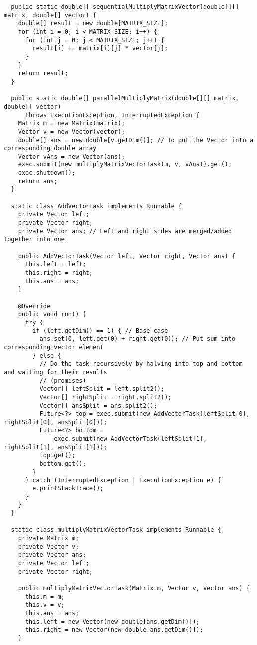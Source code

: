 \documentclass[11pt,letterpaper]{exam}
\begin{document}
\begin{lstlisting}
  public static double[] sequentialMultiplyMatrixVector(double[][] matrix, double[] vector) {
    double[] result = new double[MATRIX_SIZE];
    for (int i = 0; i < MATRIX_SIZE; i++) {
      for (int j = 0; j < MATRIX_SIZE; j++) {
        result[i] += matrix[i][j] * vector[j];
      }
    }
    return result;
  }

  public static double[] parallelMultiplyMatrix(double[][] matrix, double[] vector)
      throws ExecutionException, InterruptedException {
    Matrix m = new Matrix(matrix);
    Vector v = new Vector(vector);
    double[] ans = new double[v.getDim()]; // To put the Vector into a corresponding double array
    Vector vAns = new Vector(ans);
    exec.submit(new multiplyMatrixVectorTask(m, v, vAns)).get();
    exec.shutdown();
    return ans;
  }

  static class AddVectorTask implements Runnable {
    private Vector left;
    private Vector right;
    private Vector ans; // Left and right sides are merged/added together into one

    public AddVectorTask(Vector left, Vector right, Vector ans) {
      this.left = left;
      this.right = right;
      this.ans = ans;
    }

    @Override
    public void run() {
      try {
        if (left.getDim() == 1) { // Base case
          ans.set(0, left.get(0) + right.get(0)); // Put sum into corresponding vector element
        } else {
          // Do the task recursively by halving into top and bottom and waiting for their results
          // (promises)
          Vector[] leftSplit = left.split2();
          Vector[] rightSplit = right.split2();
          Vector[] ansSplit = ans.split2();
          Future<?> top = exec.submit(new AddVectorTask(leftSplit[0], rightSplit[0], ansSplit[0]));
          Future<?> bottom =
              exec.submit(new AddVectorTask(leftSplit[1], rightSplit[1], ansSplit[1]));
          top.get();
          bottom.get();
        }
      } catch (InterruptedException | ExecutionException e) {
        e.printStackTrace();
      }
    }
  }

  static class multiplyMatrixVectorTask implements Runnable {
    private Matrix m;
    private Vector v;
    private Vector ans;
    private Vector left;
    private Vector right;

    public multiplyMatrixVectorTask(Matrix m, Vector v, Vector ans) {
      this.m = m;
      this.v = v;
      this.ans = ans;
      this.left = new Vector(new double[ans.getDim()]);
      this.right = new Vector(new double[ans.getDim()]);
    }


\end{lstlisting}
\end{document}
